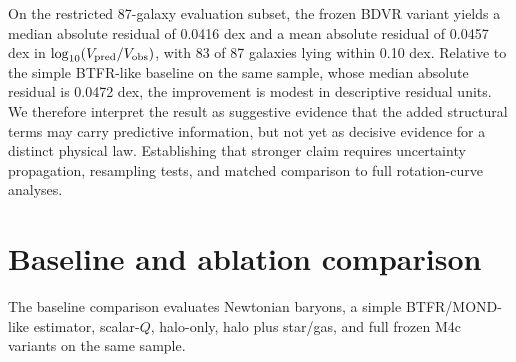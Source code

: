 \documentclass[aps,prd,preprint,nofootinbib,superscriptaddress]{revtex4-2}
\begin{document}
On the restricted 87-galaxy evaluation subset, the frozen BDVR variant yields a median absolute residual of 0.0416 dex and a mean absolute residual of 0.0457 dex in $\log_{10}(V_{\rm pred}/V_{\rm obs})$, with 83 of 87 galaxies lying within 0.10 dex. Relative to the simple BTFR-like baseline on the same sample, whose median absolute residual is 0.0472 dex, the improvement is modest in descriptive residual units. We therefore interpret the result as suggestive evidence that the added structural terms may carry predictive information, but not yet as decisive evidence for a distinct physical law. Establishing that stronger claim requires uncertainty propagation, resampling tests, and matched comparison to full rotation-curve analyses.

\section{Baseline and ablation comparison}

The baseline comparison evaluates Newtonian baryons, a simple BTFR/MOND-like estimator, scalar-$Q$, halo-only, halo plus star/gas, and full frozen M4c variants on the same sample.

\begin{table}[t]
\centering
\scriptsize
\caption{Baseline and ablation comparison on the same SPARC quality-1 sample.}
\label{tab:baseline-ablation}
\end{table}
\end{document}
